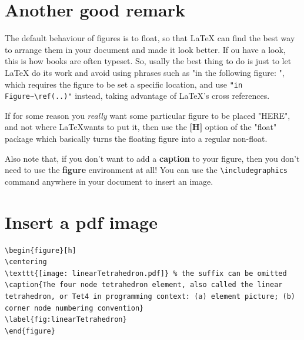 \section{Another good remark}
The default behaviour of figures is to float, so that \LaTeX{} can find the best way to arrange them in your document and made it look better. If ou have a look, this is how books are often typeset. So, usally the best thing to do is just to let \LaTeX{} do its work and avoid using phrases such as "in the following figure: ", which requires the figure to be set a specific location, and use \verb|"in Figure~\ref(..)"| instead, taking advantage of \LaTeX's cross references.

If for some reason you \emph{really} want some particular figure to be placed "HERE", and not where \LaTeX wants to put it, then use the \textbf{[H]} option of the "float" package which basically turns the floating figure into a regular non-float.

Also note that, if you don't want to add a \textbf{caption} to your figure, then you don't need to use the \textbf{figure} environment at all! You can use the \verb|\includegraphics| command anywhere in your document to insert an image.

\section{Insert a pdf image}
\begin{lstlisting}[language={[LaTeX]TeX}]
\begin{figure}[h]
\centering
\texttt{[image: linearTetrahedron.pdf]} % the suffix can be omitted
\caption{The four node tetrahedron element, also called the linear tetrahedron, or Tet4 in programming context: (a) element picture; (b) corner node numbering convention}
\label{fig:linearTetrahedron}
\end{figure}
\end{lstlisting}
